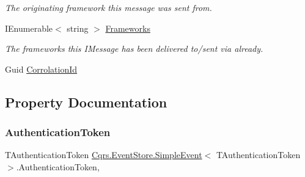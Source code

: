 \begin{DoxyCompactItemize}
\begin{DoxyCompactList}\small\item\em The originating framework this message was sent from. \end{DoxyCompactList}\item 
I\+Enumerable$<$ string $>$ \hyperlink{classCqrs_1_1EventStore_1_1SimpleEvent_ac9f0b878d05f7a3fde9560ae9477c9ec_ac9f0b878d05f7a3fde9560ae9477c9ec}{Frameworks}
\begin{DoxyCompactList}\small\item\em The frameworks this I\+Message has been delivered to/sent via already. \end{DoxyCompactList}\item 
Guid \hyperlink{classCqrs_1_1EventStore_1_1SimpleEvent_a1f0f55ac94ac408f10ad2fd8b3843ddf_a1f0f55ac94ac408f10ad2fd8b3843ddf}{Corrolation\+Id}
\end{DoxyCompactItemize}


\subsection{Property Documentation}
\mbox{\label{classCqrs_1_1EventStore_1_1SimpleEvent_a91ca9d263c41a4b5ffc30f9245aa6fe9_a91ca9d263c41a4b5ffc30f9245aa6fe9}} 
\subsubsection{\texorpdfstring{Authentication\+Token}{AuthenticationToken}}
{\footnotesize\ttfamily T\+Authentication\+Token \hyperlink{classCqrs_1_1EventStore_1_1SimpleEvent}{Cqrs.\+Event\+Store.\+Simple\+Event}$<$ T\+Authentication\+Token $>$.Authentication\+Token\hspace{0.3cm}{\ttfamily [get]}, {\ttfamily [set]}}

\mbox{\label{classCqrs_1_1EventStore_1_1SimpleEvent_aa96b900b0fef8e6b2f6af81b5ce99f16_aa96b900b0fef8e6b2f6af81b5ce99f16}} 
